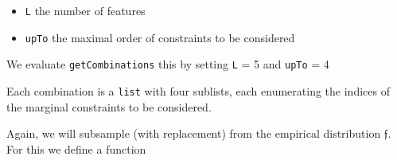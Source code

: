 \documentclass[
]{article}
\newenvironment{Shaded}{\begin{snugshade}}{\end{snugshade}}
\newcommand{\AttributeTok}[1]{\textcolor[rgb]{0.77,0.63,0.00}{#1}}
\newcommand{\DecValTok}[1]{\textcolor[rgb]{0.00,0.00,0.81}{#1}}
\newcommand{\FunctionTok}[1]{\textcolor[rgb]{0.00,0.00,0.00}{#1}}
\newcommand{\NormalTok}[1]{#1}
\newcommand{\OtherTok}[1]{\textcolor[rgb]{0.56,0.35,0.01}{#1}}
\newcommand{\SpecialCharTok}[1]{\textcolor[rgb]{0.00,0.00,0.00}{#1}}
\newcommand{\StringTok}[1]{\textcolor[rgb]{0.31,0.60,0.02}{#1}}
\providecommand{\tightlist}{%
  \setlength{\itemsep}{0pt}\setlength{\parskip}{0pt}}
\newcommand{\prob}[1]{\mathfrak{#1}}
\begin{document}
\begin{itemize}
\tightlist
\item
  \texttt{L} the number of features
\item
  \texttt{upTo} the maximal order of constraints to be considered
\end{itemize}

We evaluate \texttt{getCombinations} this by setting \texttt{L} = 5 and
\texttt{upTo} = 4

\begin{Shaded}
\end{Shaded}

Each combination is a \texttt{list} with four sublists, each enumerating
the indices of the marginal constraints to be considered.

Again, we will subsample (with replacement) from the empirical
distribution \(\prob f\). For this we define a function
\end{document}
